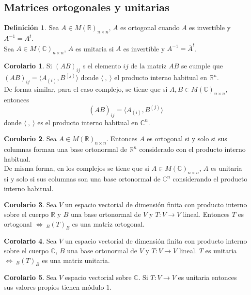 \documentclass[10pt]{article}
\theoremstyle{definition}
\newtheorem{definition}{Definición}[section]
\newtheorem{corollary}{Corolario}[theorem]
\begin{document}
\subsection{Matrices ortogonales y unitarias}
\begin{definition}
    Sea $A\in M(\mathbb{R})_{n\times n}$, $A$ es ortogonal cuando $A$ es invertible y $A^{-1}=A^t$.\\
    Sea $A\in M(\mathbb{C})_{n\times n}$, $A$ es unitaria si $A$ es invertible y $A^{-1}=\overline{A}^t$.
\end{definition}
\begin{corollary}
    Si $(AB)_{ij}$ s el elemento $ij$ de la matriz $AB$ se cumple que $(AB)_{ij}=\langle A_{(i)},B^{(j)}\rangle$ donde $\langle\ ,\ \rangle$ el producto interno habitual en $\mathbb{R}^n$.\\
    De forma similar, para el caso complejo, se tiene que si $A,B\in M(\mathbb{C})_{n\times n}$, entonces $$(A\overline{B})_{ij}=\langle A_{(i)},B^{(j)}\rangle$$
    donde $\langle\ ,\ \rangle$ es el producto interno habitual en $\mathbb{C}^n$.
\end{corollary}
\begin{corollary}
    Sea $A\in M(\mathbb{R})_{n\times n}$. Entonces $A$ es ortogonal si y solo si sus columnas forman una base ortonormal de $\mathbb{R}^n$ considerado con el producto interno habitual.\\
    De misma forma, en los complejos se tiene que si $A\in M(\mathbb{C})_{n\times n}$, $A$ es unitaria si y solo si sus columnas son una base ortonormal de $\mathbb{C}^n$ considerando el producto interno habitual.
\end{corollary}
\begin{corollary}
    Sea $V$ un espacio vectorial de dimensión finita con producto interno sobre el cuerpo $\mathbb{R}$ y $B$ una base ortonormal de $V$ y $T:V\to V$ lineal. Entonces $T$ es ortogonal $\Leftrightarrow\ _B(T)_B$ es una matriz ortogonal.
\end{corollary}
\begin{corollary}
    Sea $V$ un espacio vectorial de dimensión finita con producto interno sobre el cuerpo $\mathbb{C}$, $B$ una base ortonormal de $V$ y $T:V\to V$ lineal. $T$ es unitaria $\Leftrightarrow\ _B(T)_B$ es una matriz unitaria.
\end{corollary}
\begin{corollary}
    Sea $V$ espacio vectorial sobre $\mathbb{C}$. Si $T:V\to V$ es unitaria entonces sus valores propios tienen módulo $1$.
\end{corollary}
\end{document}
